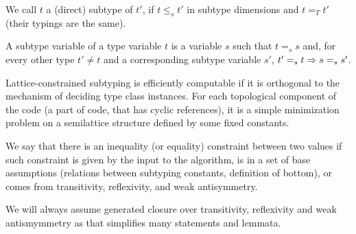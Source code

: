 \begin{defn}
    We call $t$ a (direct) subtype of $t'$, if $t \leq_s t'$ in subtype dimensions and $t =_T t'$ (their typings are the same).
\end{defn}

\begin{defn}
    A subtype variable of a type variable $t$ is a variable $s$ such that $t =_s s$ and, for every other type $t' \neq t$ and a corresponding subtype variable $s'$, $t' =_s t \Rightarrow s =_s s'$.
\end{defn}

Lattice-constrained subtyping is efficiently computable if it is orthogonal to the mechanism of deciding type class instances. For each topological component of the code (a part of code, that has cyclic references), it is a simple minimization problem on a semilattice structure defined by some fixed constants.

\begin{cor}
    We say that there is an inequality (or equality) constraint between two values if such constraint is given by the input to the algorithm, is in a set of base assumptions (relations between subtyping constants, definition of bottom), or comes from transitivity, reflexivity, and weak antisymmetry.

    We will always assume generated closure over transitivity, reflexivity and weak antismymmetry as that simplifies many statements and lemmata.
\end{cor}

